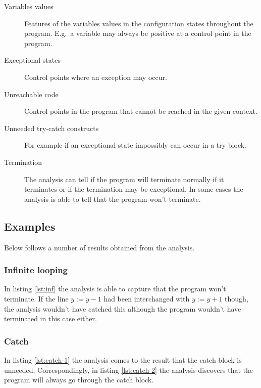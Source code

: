 \documentclass[11pt,oneside,a4paper]{article}
\begin{document}
  \begin{description}
    \item[Variables values] Features of the variables values in the
      configuration states throughout the program. E.g.\ a variable may always
      be positive at a control point in the program.
    \item[Exceptional states] Control points where an exception may occur.
    \item[Unreachable code] Control points in the program that cannot be
      reached in the given context.
    \item[Unneeded try-catch constructs] For example if an exceptional state
      impossibly can occur in a try block.
    \item[Termination] The analysis can tell if the program will terminate
      normally if it terminates or if the termination may be exceptional. In
      some cases the analysis is able to tell that the program won't terminate.
  \end{description}

  \subsection*{Examples}
    Below follows a number of results obtained from the analysis.

    \subsubsection*{Infinite looping}
      In listing \ref{lst:inf} the analysis is able to capture that the program
      won't terminate. If the line $y := y - 1$ had been interchanged with $y
      := y + 1$ though, the analysis wouldn't have catched this although the
      program wouldn't have terminated in this case either.

      

    \subsubsection*{Catch}
      In listing \ref{lst:catch-1} the analysis comes to the result that the
      catch block is unneeded. Correspondingly, in listing \ref{lst:catch-2}
      the analysis discovers that the program will always go through the catch
      block.

      
\end{document}
